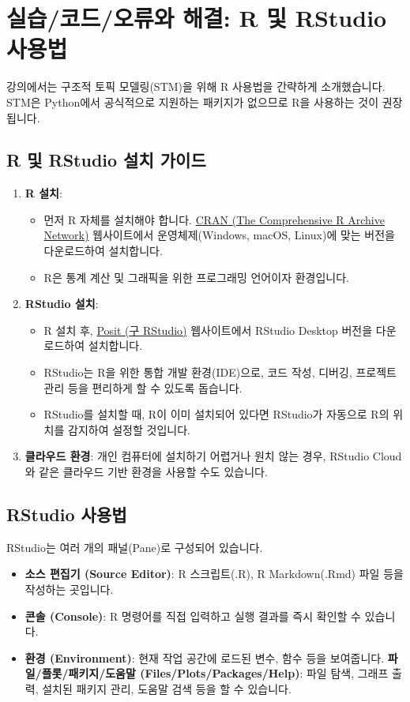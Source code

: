 \documentclass[11pt,a4paper]{article}
\theoremstyle{definition}
\begin{document}
\newpage
\section*{실습/코드/오류와 해결: R 및 RStudio 사용법}
강의에서는 구조적 토픽 모델링(STM)을 위해 R 사용법을 간략하게 소개했습니다. STM은 Python에서 공식적으로 지원하는 패키지가 없으므로 R을 사용하는 것이 권장됩니다.

\subsection*{R 및 RStudio 설치 가이드}
\begin{enumerate}
    \item \textbf{R 설치}:
    \begin{itemize}
        \item 먼저 R 자체를 설치해야 합니다. \href{https://cran.r-project.org/}{CRAN (The Comprehensive R Archive Network)} 웹사이트에서 운영체제(Windows, macOS, Linux)에 맞는 버전을 다운로드하여 설치합니다.
        \item R은 통계 계산 및 그래픽을 위한 프로그래밍 언어이자 환경입니다.
    \end{itemize}
    \item \textbf{RStudio 설치}:
    \begin{itemize}
        \item R 설치 후, \href{https://posit.co/download/rstudio-desktop/}{Posit (구 RStudio)} 웹사이트에서 RStudio Desktop 버전을 다운로드하여 설치합니다.
        \item RStudio는 R을 위한 통합 개발 환경(IDE)으로, 코드 작성, 디버깅, 프로젝트 관리 등을 편리하게 할 수 있도록 돕습니다.
        \item RStudio를 설치할 때, R이 이미 설치되어 있다면 RStudio가 자동으로 R의 위치를 감지하여 설정할 것입니다.
    \end{itemize}
    \item \textbf{클라우드 환경}: 개인 컴퓨터에 설치하기 어렵거나 원치 않는 경우, RStudio Cloud와 같은 클라우드 기반 환경을 사용할 수도 있습니다.
\end{enumerate}

\subsection*{RStudio 사용법}
RStudio는 여러 개의 패널(Pane)로 구성되어 있습니다.
\begin{itemize}
    \item \textbf{소스 편집기 (Source Editor)}: R 스크립트(.R), R Markdown(.Rmd) 파일 등을 작성하는 곳입니다.
    \item \textbf{콘솔 (Console)}: R 명령어를 직접 입력하고 실행 결과를 즉시 확인할 수 있습니다.
    \item \textbf{환경 (Environment)}: 현재 작업 공간에 로드된 변수, 함수 등을 보여줍니다.
    \textbf{파일/플롯/패키지/도움말 (Files/Plots/Packages/Help)}: 파일 탐색, 그래프 출력, 설치된 패키지 관리, 도움말 검색 등을 할 수 있습니다.
\end{itemize}
\end{document}
